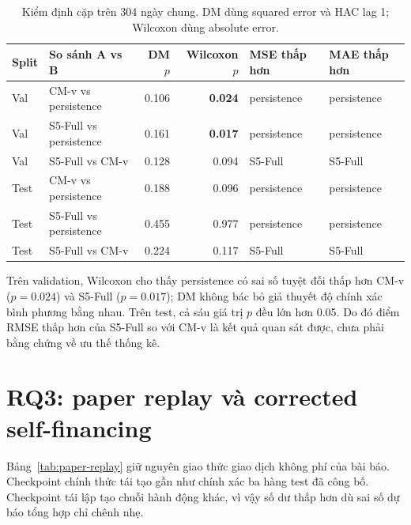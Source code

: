 \documentclass[13pt,a4paper,oneside]{report}
\begin{document}
\begin{table}[H]
\centering
\caption{Kiểm định cặp trên 304 ngày chung. DM dùng squared error và HAC lag 1; Wilcoxon dùng
absolute error.}
\label{tab:paired-tests}
{\small
\begin{tabularx}{\linewidth}{@{}llrrll@{}}
\toprule
\textbf{Split} & \textbf{So sánh A vs B} & \textbf{DM $p$} & \textbf{Wilcoxon $p$} & \textbf{MSE thấp hơn} & \textbf{MAE thấp hơn} \\
\midrule
Val & CM-v vs persistence & \num{0.106} & \textbf{\num{0.024}} & persistence & persistence \\
Val & S5-Full vs persistence & \num{0.161} & \textbf{\num{0.017}} & persistence & persistence \\
Val & S5-Full vs CM-v & \num{0.128} & \num{0.094} & S5-Full & S5-Full \\
\midrule
Test & CM-v vs persistence & \num{0.188} & \num{0.096} & persistence & persistence \\
Test & S5-Full vs persistence & \num{0.455} & \num{0.977} & persistence & persistence \\
Test & S5-Full vs CM-v & \num{0.224} & \num{0.117} & S5-Full & S5-Full \\
\bottomrule
\end{tabularx}}
\end{table}

Trên validation, Wilcoxon cho thấy persistence có sai số tuyệt đối thấp hơn CM-v
($p=\num{0.024}$) và S5-Full ($p=\num{0.017}$); DM không bác bỏ giả thuyết độ chính xác bình phương
bằng nhau. Trên test, cả sáu giá trị $p$ đều lớn hơn 0.05. Do đó điểm RMSE thấp hơn của S5-Full so
với CM-v là kết quả quan sát được, chưa phải bằng chứng về ưu thế thống kê.

\section{RQ3: paper replay và corrected self-financing}\label{sec:rq3-results}
Bảng~\ref{tab:paper-replay} giữ nguyên giao thức giao dịch không phí của bài báo. Checkpoint chính
thức tái tạo gần như chính xác ba hàng test đã công bố. Checkpoint tái lập tạo chuỗi hành động khác,
vì vậy số dư thấp hơn dù sai số dự báo tổng hợp chỉ chênh nhẹ.
\end{document}
